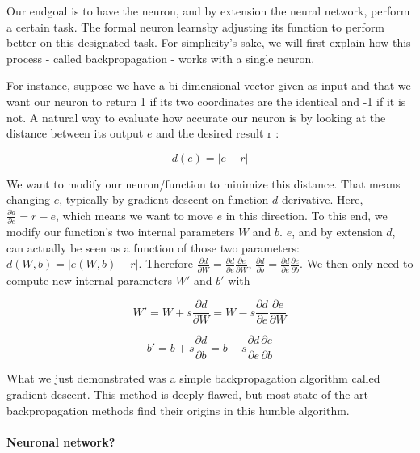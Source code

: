 \documentclass[conference]{IEEEtran}
\begin{document}
Our endgoal is to have the neuron, and by extension the neural network, perform
a certain task. The formal neuron \og learns\fg by adjusting its function to perform better on
this designated task. For simplicity's sake, we will first explain how this
process - called \og backpropagation\fg{} - works with a single neuron.

For instance, suppose we have a bi-dimensional vector given as input and that we
want our neuron to return 1 if its two coordinates are the identical and -1 if
it is not. A natural way to evaluate how accurate our neuron is by looking at the
distance between its output $e$ and the desired result r :

\begin{equation}
d(e)=|e-r|  
\end{equation}

We want to modify our neuron/function to minimize this distance. That means
changing $e$, typically by gradient descent on function $d$ derivative. Here,
$\frac{\partial d}{\partial e} = r-e$, which means we want to \og move\fg{} $e$ in this
direction. To this end, we modify our function's two internal parameters $W$ and
$b$. $e$, and by extension $d$, can actually be seen as a function of those two
parameters: $d(W,b)=|e(W,b)-r|$. Therefore $\frac{\partial d}{\partial W}
   = \frac{\partial d}{\partial e}\frac{\partial e}{\partial W}$,
$\frac{\partial d}{\partial b}
   = \frac{\partial d}{\partial e}\frac{\partial e}{\partial b}$. We then only
   need to compute new internal parameters $W'$ and $b'$ with 

\begin{equation}
     W'=W + s\frac{\partial d}{\partial W}=W-s\frac{\partial d}{\partial e}\frac{\partial e}{\partial W}
\end{equation}

\begin{equation}
     b'=b + s\frac{\partial d}{\partial b}=b-s\frac{\partial d}{\partial e}\frac{\partial e}{\partial b}
\end{equation}

What we just demonstrated was a simple backpropagation algorithm called gradient
descent. This method is deeply flawed, but most state of the art backpropagation
methods find their origins in this humble algorithm.

\paragraph{Neuronal network?}
\end{document}
